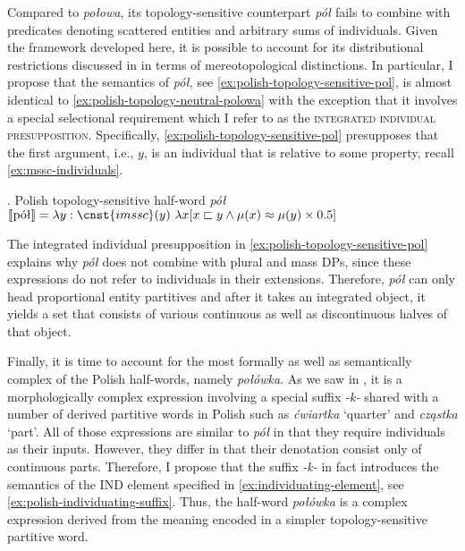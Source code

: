 	Compared to \textit{połowa}, its topology-sensitive counterpart \textit{pół} fails to combine with predicates denoting scattered entities and arbitrary sums of individuals. Given the framework developed here, it is possible to account for its distributional restrictions discussed in  in terms of mereotopological distinctions. In particular, I propose that the semantics of \textit{pół}, see \ref{ex:polish-topology-sensitive-pol}, is almost identical to \ref{ex:polish-topology-neutral-polowa} with the exception that it involves a special selectional requirement which I refer to as the \textsc{integrated individual presupposition}. Specifically, \ref{ex:polish-topology-sensitive-pol} presupposes that the first argument, i.e., $y$, is an individual that is  relative to some property, recall \ref{ex:mssc-individuals}. 
	
	\ex. Polish topology-sensitive half-word \textit{pół}\\
	$\llbracket \text{pół}\rrbracket = \lambda y : \cnst{imssc}(y)\ \lambda x [x \sqsubset y \wedge \mu(x) \approx \mu(y) \times 0.5]$\label{ex:polish-topology-sensitive-pol}

	The integrated individual presupposition in \ref{ex:polish-topology-sensitive-pol} explains why \textit{pół} does not combine with plural and mass DPs, since these expressions do not refer to  individuals in their extensions. Therefore, \textit{pół} can only head proportional entity partitives and after it takes an integrated object, it yields a set that consists of various continuous as well as discontinuous halves of that object.
	
	Finally, it is time to account for the most formally as well as semantically complex of the Polish half-words, namely \textit{połówka}. As we saw in , it is a morphologically complex expression involving a special suffix \textit{-k-} shared with a number of derived partitive words in Polish such as \textit{ćwiartka} `quarter' and \textit{cząstka} `part'. All of those expressions are similar to \textit{pół} in that they require  individuals as their inputs. However, they differ in that their denotation consist only of continuous parts. Therefore, I propose that the suffix \textit{-k-} in fact introduces the semantics of the IND element specified in \ref{ex:individuating-element}, see \ref{ex:polish-individuating-suffix}. Thus, the half-word \textit{połówka} is a complex expression derived from the meaning encoded in a simpler topology-sensitive partitive word.
	
